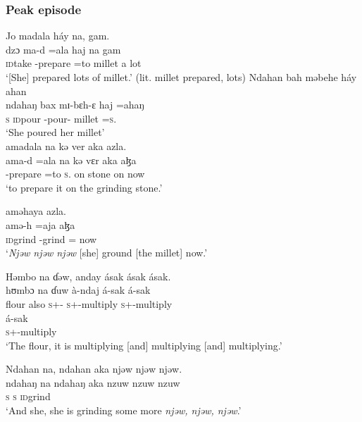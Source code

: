 \subsubsection*{Peak episode}
 \ea  Jo  madala  háy  na,  gam.  \\
\gll dzɔ    ma-d    =ala  haj na gam\\
 \textsc{id}take  {\NOM}-prepare  =to  millet   {\PSP}    {a lot}\\
 \glt ‘[She] prepared lots of millet.' (lit. millet prepared, lots)
 \z
 \ea  Ndahan  bah  məbehe  háy  ahan  \\
\gll ndahaŋ  bax        mɪ-bɛh-ɛ       haj       =ahaŋ         \\
 \textsc{s}          \textsc{id}pour  {\NOM}{}-pour-{\CL}  millet  =\textsc{s}.{\POSS}  \\
 \glt ‘She poured her millet’\\
 
 \medskip
 amadala  na  kə  ver  aka  azla.\\
\gll ama-d  =ala     na        kə  vɛr     aka  aɮa\\
 {\DEP}-prepare  =to   \textsc{s}.{\DO}  on   stone  on   now\\
 \glt ‘to prepare it on the grinding stone.’
 \z
 
   aməhaya  azla.\\
  amə-h    =aja  aɮa\\
 \textsc{id}grind                        {\DEP}-grind  ={\PLU}   now\\
 \glt ‘\textit{Njəw  njəw  njəw} [she] ground [the millet] now.’
 \z
 
 \ea  Həmbo  na  ɗəw,  anday  ásak   ásak  ásak.\\
\gll hʊmbɔ  na   ɗuw à-ndaj            á-sak     á-sak\\     
 flour  {\PSP}  also   \textsc{s}+{\PFV}-{\PRG}   \textsc{s}+{\IFV}-multiply  \textsc{s}+{\IFV}-multiply\\ 
 
 \medskip
 \gll á-sak\\
      \textsc{s}+{\IFV}-multiply \\
 \glt ‘The flour, it is multiplying [and] multiplying [and] multiplying.’
 \z
 
 \ea  Ndahan  na,  ndahan  aka  {njəw  njəw  njəw.}      \\
 \gll ndahaŋ   na ndahaŋ  aka       {nzuw  nzuw  nzuw}     \\
 \textsc{s}  {\PSP}  \textsc{s}       {\EXT}  \textsc{id}grind\\
 \glt ‘And she, she is grinding some more \textit{njəw, njəw, njəw}.’
 \z
 
